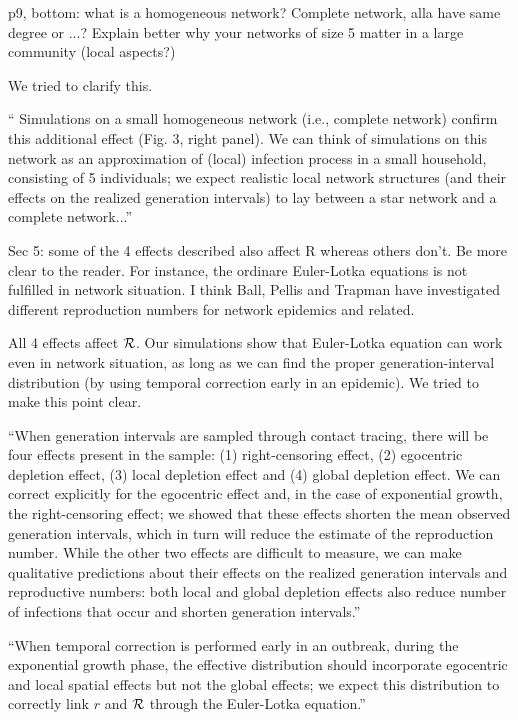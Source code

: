 \documentclass[12pt]{article}
\newcommand{\RR}{\ensuremath{{\cal R}}}
\newcommand{\revtext}{\textsf}
\begin{document}
\revtext{p9, bottom: what is a homogeneous network? Complete network, alla have same degree or ...? Explain better why your networks of size 5 matter in a large community (local aspects?)}

We tried to clarify this.

``
Simulations on a small homogeneous network (i.e., complete network) confirm this additional effect (Fig. 3, right panel). We can think of simulations on this network as an approximation of (local) infection process in a small household, consisting of 5 individuals;
we expect realistic local network structures (and their effects on the realized generation intervals) to lay between a star network and a complete network...''

\revtext{Sec 5: some of the 4 effects described also affect R whereas others don't. Be more clear to the reader. For instance, the ordinare Euler-Lotka equations is not fulfilled in network situation. I think Ball, Pellis and Trapman have investigated different reproduction numbers for network epidemics and related.}

All 4 effects affect $\RR$. Our simulations show that Euler-Lotka equation can work even in network situation, as long as we can find the proper generation-interval distribution (by using temporal correction early in an epidemic). We tried to make this point clear.

``When generation intervals are sampled through contact tracing, there will be four effects present in the sample: (1) right-censoring effect, (2) egocentric depletion effect, (3) local depletion effect and (4) global depletion effect.
We can correct explicitly for the egocentric effect and, in the case of exponential growth, the right-censoring effect;
we showed that these effects shorten the mean observed generation intervals, which in turn will reduce the estimate of the reproduction number.
While the other two effects are difficult to measure, we can make qualitative predictions about their effects on the realized generation intervals and reproductive numbers: 
both local and global depletion effects also reduce number of infections that occur and shorten generation intervals.''

``When temporal correction is performed early in an outbreak, during the exponential growth phase, the effective distribution should incorporate egocentric and local spatial effects but not the global effects; we expect this distribution to correctly link $r$ and $\RR$ through the Euler-Lotka equation.''
\end{document}
